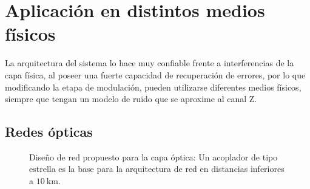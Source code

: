 \section{Aplicación en distintos medios físicos}
La arquitectura del sistema lo hace muy confiable frente a interferencias de la capa física, al poseer una fuerte capacidad de recuperación de errores, por lo que modificando la etapa de modulación, pueden utilizarse diferentes medios físicos, siempre que tengan un modelo de ruido que se aproxime al canal Z.
\subsection{Redes ópticas}


\begin{figure}[t]
  \centering
    \qquad
    \caption{Diseño de red propuesto para la capa óptica: Un acoplador de tipo estrella es la base para la arquitectura de red en distancias inferiores a $10~\mathrm{km}$.}
    \label{arch:fig1}
\end{figure}




